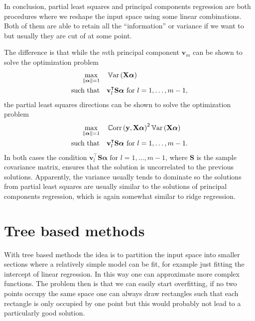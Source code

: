 \documentclass[a4paper, 12pt]{scrartcl}
\newcommand{\bfalpha}{\boldsymbol{\alpha}}
\newcommand{\var}{\operatorname{\mathbb{V}ar}}
\newcommand{\cor}{\operatorname{\mathbb{C}orr}}
\begin{document}
In conclusion, partial least squares and principal components regression are both procedures where we reshape the input space using some linear combinations.
Both of them are able to retain all the ``information'' or variance if we want to but usually they are cut of at some point.

The difference is that while the $m$th principal component $\mathbf{v}_m$ can be shown to solve the optimization problem
\begin{equation*}
	\begin{aligned}
	\operatornamewithlimits{max}_{\left\|\bfalpha\right\|=1} & & &\var\left(\mathbf{X}\bfalpha\right)\\
	\text{such that} & & & \mathbf{v}_l^\intercal\mathbf{S}\bfalpha\text{ for }l=1,\dots,m-1,
	\end{aligned}
\end{equation*}
the partial least squares directions can be shown to solve the optimization problem
\begin{equation*}
	\begin{aligned}
	\operatornamewithlimits{max}_{\left\|\bfalpha\right\|=1} & & &\cor\left(\mathbf{y},\mathbf{X}\bfalpha\right)^2\var\left(\mathbf{X}\bfalpha\right)\\
	\text{such that} & & & \mathbf{v}_l^\intercal\mathbf{S}\bfalpha\text{ for }l=1,\dots,m-1.
\end{aligned}
\end{equation*}
In both cases the condition $\mathbf{v}_l^\intercal\mathbf{S}\bfalpha\text{ for }l=1,\dots,m-1$, where $\mathbf{S}$ is the sample covariance matrix, ensures that the solution is uncorrelated to the previous solutions.
Apparently, the variance usually tends to dominate so the solutions from partial least squares are usually similar to the solutions of principal components regression, which is again somewhat similar to ridge regression.

\section{Tree based methods}
With tree based methods the idea is to partition the input space into smaller sections where a relatively simple model can be fit, for example just fitting the intercept of linear regression.
In this way one can approximate more complex functions.
The problem then is that we can easily start overfitting, if no two points occupy the same space one can always draw rectangles such that each rectangle is only occupied by one point but this would probably not lead to a particularly good solution.
\end{document}

